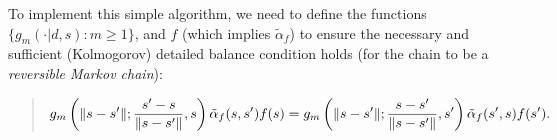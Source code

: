 \documentclass[a4paper,10pt,english]{sphinxmanual}
\begin{document}
\begin{center}\setlength{\fboxsep}{5pt}\end{center}

To implement this simple algorithm, we need to define the functions \(\{ g_m(\cdot | d,s) : m \geq 1 \}\), and \(f\) (which implies \(\tilde{\alpha}_f\)) to ensure the necessary and sufficient (Kolmogorov) detailed balance condition holds (for the chain to be a \emph{reversible Markov chain}):
\begin{quote}
\begin{gather}
\begin{split}g_m \left( \| s - s' \| ; \frac{s' - s}{\| s - s' \|}, s
\right) \tilde{\alpha}_f(s,s')f(s) =
g_m \left( \| s - s' \| ; \frac{s - s'}{\| s - s' \|}, s'
\right) \tilde{\alpha}_f(s',s)f(s').\end{split}\notag
\end{gather}\end{quote}
\end{document}
